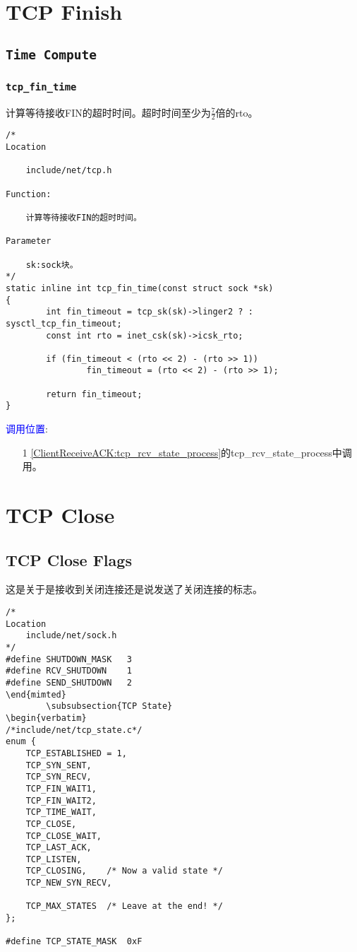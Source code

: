 \section{TCP Finish}
    \subsection{\texttt{Time Compute}}
        \subsubsection{\texttt{tcp_fin_time}}
            计算等待接收FIN的超时时间。超时时间至少为$\frac{7}{2}$倍的rto。
\begin{verbatim}
/*
Location

    include/net/tcp.h

Function:

    计算等待接收FIN的超时时间。

Parameter

    sk:sock块。
*/
static inline int tcp_fin_time(const struct sock *sk)
{
        int fin_timeout = tcp_sk(sk)->linger2 ? : sysctl_tcp_fin_timeout;
        const int rto = inet_csk(sk)->icsk_rto;

        if (fin_timeout < (rto << 2) - (rto >> 1))
                fin_timeout = (rto << 2) - (rto >> 1);

        return fin_timeout;
}
\end{verbatim}
        \textcolor{blue}{调用位置}:

            \begin{enumerate}
                \item[1]        \ref{ClientReceiveACK:tcp_rcv_state_process}的tcp\_rcv\_state\_process中调用。
            \end{enumerate}

\section{TCP Close}
        \subsection{TCP Close Flags}
            这是关于是接收到关闭连接还是说发送了关闭连接的标志。
\begin{verbatim}
/*
Location
    include/net/sock.h
*/
#define SHUTDOWN_MASK   3
#define RCV_SHUTDOWN    1
#define SEND_SHUTDOWN   2
\end{mimted}
        \subsubsection{TCP State}
\begin{verbatim}
/*include/net/tcp_state.c*/
enum {
    TCP_ESTABLISHED = 1,
    TCP_SYN_SENT,
    TCP_SYN_RECV,
    TCP_FIN_WAIT1,
    TCP_FIN_WAIT2,
    TCP_TIME_WAIT,
    TCP_CLOSE,
    TCP_CLOSE_WAIT,
    TCP_LAST_ACK,
    TCP_LISTEN,
    TCP_CLOSING,    /* Now a valid state */
    TCP_NEW_SYN_RECV,

    TCP_MAX_STATES  /* Leave at the end! */
};

#define TCP_STATE_MASK  0xF
\end{verbatim}

